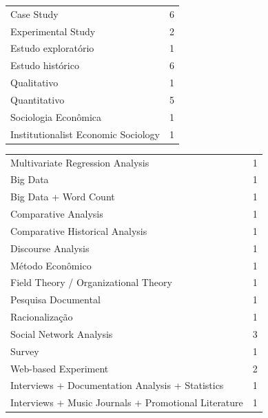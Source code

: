 \documentclass[a4paper, 12pt, openright, oneside, german, french, english, brazil]{abntex2}
\begin{document}


			\begin{table}[ht]
				{\begin{tabular}{lr}
					\hline
					\hline
					Case Study &   6 \\
					Experimental Study &   2 \\
					Estudo exploratório &   1 \\
					Estudo histórico &   6 \\
					Qualitativo &   1 \\
					Quantitativo &   5 \\
					Sociologia Econômica &   1 \\
					Institutionalist Economic Sociology &   1 \\
					\hline
					\end{tabular}
				}
				{}
			\end{table}







					\begin{table}[ht]
						{\begin{tabular}{lr}
							\hline
							\hline
							Multivariate Regression Analysis &   1 \\
							Big Data &   1 \\
							Big Data + Word Count &   1 \\
							Comparative Analysis &   1 \\
							Comparative Historical Analysis &   1 \\
							Discourse Analysis &   1 \\
							Método Econômico &   1 \\
							Field Theory / Organizational Theory &   1 \\
							Pesquisa Documental &   1 \\
							Racionalização &   1 \\
							Social Network Analysis &   3 \\
							Survey &   1 \\
							Web-based Experiment &   2 \\
							Interviews + Documentation Analysis + Statistics  &  1 \\
							Interviews + Music Journals + Promotional Literature &   1 \\
							\hline
						\end{tabular}
					}
					{}
					\end{table}
\end{document}
